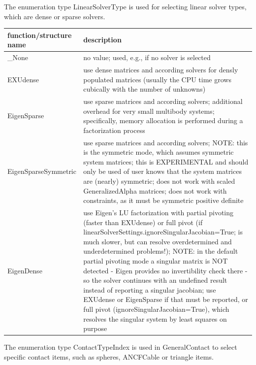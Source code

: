 \label{sec:LinearSolverType}
The enumeration type  LinearSolverType is used for selecting linear solver types, which are dense or sparse solvers.



\begin{center}
\footnotesize
\begin{longtable}{| p{8cm} | p{8cm} |} 
\hline
{\bf function/structure name} & {\bf description}\\ \hline
  \_None & no value; used, e.g., if no solver is selected\\ \hline  
  EXUdense & use dense matrices and according solvers for densly populated matrices (usually the CPU time grows cubically with the number of unknowns)\\ \hline  
  EigenSparse & use sparse matrices and according solvers; additional overhead for very small multibody systems; specifically, memory allocation is performed during a factorization process\\ \hline  
  EigenSparseSymmetric & use sparse matrices and according solvers; NOTE: this is the symmetric mode, which assumes symmetric system matrices; this is EXPERIMENTAL and should only be used of user knows that the system matrices are (nearly) symmetric; does not work with scaled GeneralizedAlpha matrices; does not work with constraints, as it must be symmetric positive definite\\ \hline  
  EigenDense & use Eigen's LU factorization with partial pivoting (faster than EXUdense) or full pivot (if linearSolverSettings.ignoreSingularJacobian=True; is much slower, but can resolve overdetermined and underdetermined problems!); NOTE: in the default partial pivoting mode a singular matrix is NOT detected - Eigen provides no invertibility check there - so the solver continues with an undefined result instead of reporting a singular jacobian; use EXUdense or EigenSparse if that must be reported, or full pivot (ignoreSingularJacobian=True), which resolves the singular system by least squares on purpose\\ \hline  
\end{longtable}
\end{center}

\label{sec:ContactTypeIndex}
The enumeration type  ContactTypeIndex is used in GeneralContact to select specific contact items, such as spheres, ANCFCable or triangle items.



